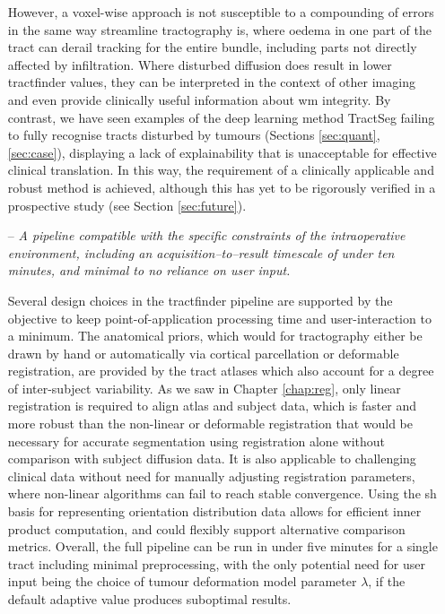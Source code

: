 \begin{itemize}
However, a voxel-wise approach is not susceptible to a compounding of errors in the same way streamline tractography is, where oedema in one part of the tract can derail tracking for the entire bundle, including parts not directly affected by infiltration.
Where disturbed diffusion does result in lower tractfinder values, they can be interpreted in the context of other imaging and even provide clinically useful information about \gls{wm} integrity.
By contrast, we have seen examples of the deep learning method TractSeg failing to fully recognise tracts disturbed by tumours (Sections \ref{sec:quant}, \ref{sec:case}), displaying a lack of explainability that is unacceptable for effective clinical translation.
In this way, the requirement of a clinically applicable and robust method is achieved, although this has yet to be rigorously verified in a prospective study (see Section \ref{sec:future}).

\item[--]\textit{A pipeline compatible with the specific constraints of the intraoperative environment, including an acquisition--to--result timescale of under ten minutes, and minimal to no reliance on user input.}

Several design choices in the tractfinder pipeline are supported by the objective to keep point-of-application processing time and user-interaction to a minimum.
The anatomical priors, which would for tractography either be drawn by hand or automatically via cortical parcellation or deformable registration, are provided by the tract atlases which also account for a degree of inter-subject variability.
As we saw in Chapter \ref{chap:reg}, only linear registration is required to align atlas and subject data, which is faster and more robust than the non-linear or deformable registration that would be necessary for accurate segmentation using registration alone without comparison with subject diffusion data.
It is also applicable to challenging clinical data without need for manually adjusting registration parameters, where non-linear algorithms can fail to reach stable convergence.
Using the \gls{sh} basis for representing orientation distribution data allows for efficient inner product computation, and could flexibly support alternative comparison metrics.
Overall, the full pipeline can be run in under five minutes for a single tract including minimal preprocessing, with the only potential need for user input being the choice of tumour deformation model parameter $\lambda$, if the default adaptive value produces suboptimal results.


\end{itemize}
